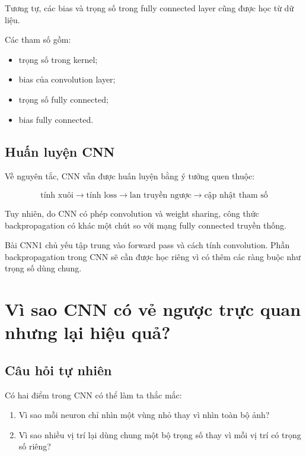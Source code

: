 \documentclass[12pt,a4paper]{report}
\begin{document}
Tương tự, các bias và trọng số trong fully connected layer cũng được học từ dữ liệu.

Các tham số gồm:

\begin{itemize}
    \item trọng số trong kernel;
    \item bias của convolution layer;
    \item trọng số fully connected;
    \item bias fully connected.
\end{itemize}

\section{Huấn luyện CNN}

Về nguyên tắc, CNN vẫn được huấn luyện bằng ý tưởng quen thuộc:

\[
    \text{tính xuôi}
    \rightarrow
    \text{tính loss}
    \rightarrow
    \text{lan truyền ngược}
    \rightarrow
    \text{cập nhật tham số}
\]

Tuy nhiên, do CNN có phép convolution và weight sharing, công thức backpropagation có khác một chút so với mạng fully connected truyền thống.

\begin{luuy}
Bài CNN1 chủ yếu tập trung vào forward pass và cách tính convolution. Phần backpropagation trong CNN sẽ cần được học riêng vì có thêm các ràng buộc như trọng số dùng chung.
\end{luuy}

\chapter{Vì sao CNN có vẻ ngược trực quan nhưng lại hiệu quả?}

\section{Câu hỏi tự nhiên}

Có hai điểm trong CNN có thể làm ta thắc mắc:

\begin{enumerate}
    \item Vì sao mỗi neuron chỉ nhìn một vùng nhỏ thay vì nhìn toàn bộ ảnh?
    \item Vì sao nhiều vị trí lại dùng chung một bộ trọng số thay vì mỗi vị trí có trọng số riêng?
\end{enumerate}
\end{document}

